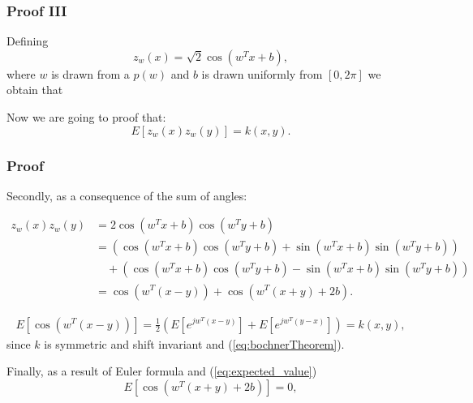 \begin{frame}
  \frametitle{Proof III}

  Defining 
\begin{equation}
    z_w(x) = \sqrt{2} \cos\left(w^T x + b\right), 
\end{equation}
where $w$ is drawn from a $p(w)$ and $b$ is drawn 
uniformly from $[0,2\pi]$ we obtain that 

Now we are going to proof that: 
\begin{equation} \label{unbiases_stimator}
    E \left[z_w(x) z_w(y) \right] = k(x,y). 
\end{equation}

\end{frame}




\begin{frame}
  \frametitle{Proof}

  Secondly, as a consequence of the sum of angles: 

\begin{align}
    z_w(x) z_w(y) 
    &=
    2  \cos\left(w^T x + b\right) \cos\left(w^T y+ b\right)
    \nonumber
    \\
    \nonumber
    & = 
    \left(
    \cos\left(w^T x + b\right) \cos\left(w^T y+ b\right)
    + 
    \sin\left(w^T x + b\right) \sin\left(w^T y+ b\right)
    \right)
    \\
    \nonumber
   & \quad +
   \left(
    \cos\left(w^T x + b\right) \cos\left(w^T y+ b\right)
    -
    \sin\left(w^T x + b\right) \sin\left(w^T y+ b\right)
    \right)
    \\
    & = 
    \cos\left(w^T (x-y) \right) + \cos\left(w^T (x+y) + 2b \right).
\end{align}


\end{frame}

\begin{frame}
  \begin{align}
    E\left[
        \cos\left(w^T (x-y) \right)
    \right]
    = 
    \frac{1}{2}
    \left(
        E\left[
         e^{j w^T (x-y)}
        \right]
        + 
        E\left[
         e^{j w^T (y-x)}
        \right]
    \right)
    = k(x,y),
\end{align}
since $k$ is symmetric and shift invariant and (\ref{eq:bochnerTheorem}).

\pause 
Finally, as a result of Euler formula and (\ref{eq:expected_value})
\begin{equation}
    E\left[
        \cos\left(w^T (x+y) + 2b \right)
    \right]
    = 
    0, 
\end{equation}

\end{frame}

